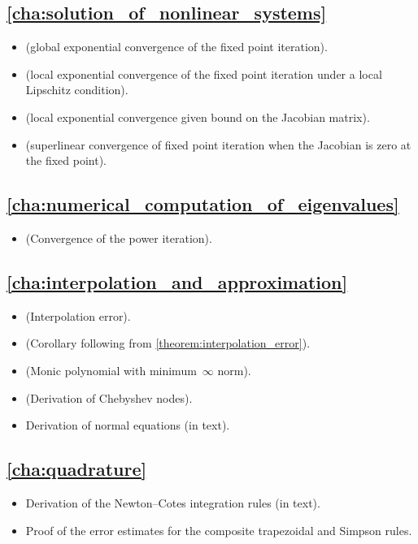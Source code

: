 \subsection*{\cref{cha:solution_of_nonlinear_systems}}%

\begin{itemize}
    \item {} (global exponential convergence of the fixed point iteration).
    \item {} (local exponential convergence of the fixed point iteration under a local Lipschitz condition).
    \item {}  (local exponential convergence given bound on the Jacobian matrix).
    \item {} (superlinear convergence of fixed point iteration when the Jacobian is zero at the fixed point).
\end{itemize}


\subsection*{\cref{cha:numerical_computation_of_eigenvalues}}%

\begin{itemize}
    \item {} (Convergence of the power iteration).
\end{itemize}


\subsection*{\cref{cha:interpolation_and_approximation}}%

\begin{itemize}
    \item {} (Interpolation error).
    \item {} (Corollary following from \cref{theorem:interpolation_error}).
    \item {} (Monic polynomial with minimum~$\infty$ norm).
    \item {} (Derivation of Chebyshev nodes).
    \item Derivation of normal equations (in text).
\end{itemize}

\subsection*{\cref{cha:quadrature}}%

\begin{itemize}
    \item Derivation of the Newton--Cotes integration rules (in text).
    \item Proof of the error estimates for the composite trapezoidal and Simpson rules.
\end{itemize}
